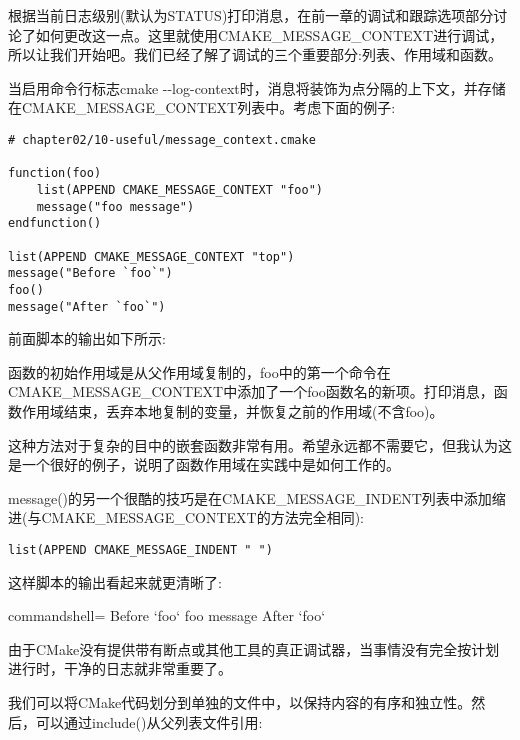 根据当前日志级别(默认为STATUS)打印消息，在前一章的调试和跟踪选项部分讨论了如何更改这一点。这里就使用CMAKE\_MESSAGE\_CONTEXT进行调试，所以让我们开始吧。我们已经了解了调试的三个重要部分:列表、作用域和函数。

当启用命令行标志cmake -{}-log-context时，消息将装饰为点分隔的上下文，并存储在CMAKE\_MESSAGE\_CONTEXT列表中。考虑下面的例子:

\begin{lstlisting}[style=styleCMake]
# chapter02/10-useful/message_context.cmake
	
function(foo)
	list(APPEND CMAKE_MESSAGE_CONTEXT "foo")
	message("foo message")
endfunction()

list(APPEND CMAKE_MESSAGE_CONTEXT "top")
message("Before `foo`")
foo()
message("After `foo`")
\end{lstlisting}

前面脚本的输出如下所示:


函数的初始作用域是从父作用域复制的，foo中的第一个命令在CMAKE\_MESSAGE\_CONTEXT中添加了一个foo函数名的新项。打印消息，函数作用域结束，丢弃本地复制的变量，并恢复之前的作用域(不含foo)。

这种方法对于复杂的目中的嵌套函数非常有用。希望永远都不需要它，但我认为这是一个很好的例子，说明了函数作用域在实践中是如何工作的。

message()的另一个很酷的技巧是在CMAKE\_MESSAGE\_INDENT列表中添加缩进(与CMAKE\_MESSAGE\_CONTEXT的方法完全相同):

\begin{lstlisting}[style=styleCMake]
list(APPEND CMAKE_MESSAGE_INDENT " ")
\end{lstlisting}

这样脚本的输出看起来就更清晰了:

\begin{tcblisting}{commandshell={}}
Before `foo`
  foo message
After `foo`
\end{tcblisting}

由于CMake没有提供带有断点或其他工具的真正调试器，当事情没有完全按计划进行时，干净的日志就非常重要了。


我们可以将CMake代码划分到单独的文件中，以保持内容的有序和独立性。然后，可以通过include()从父列表文件引用:

